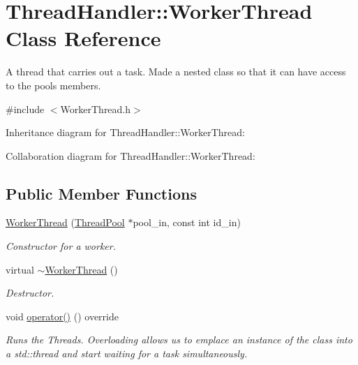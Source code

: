 \hypertarget{classThreadHandler_1_1WorkerThread}{}\section{Thread\+Handler\+::Worker\+Thread Class Reference}
\label{classThreadHandler_1_1WorkerThread}


A thread that carries out a task. Made a nested class so that it can have access to the pools members.  




{\ttfamily \#include $<$Worker\+Thread.\+h$>$}



Inheritance diagram for Thread\+Handler\+::Worker\+Thread\+:


Collaboration diagram for Thread\+Handler\+::Worker\+Thread\+:
\subsection*{Public Member Functions}
\begin{DoxyCompactItemize}
\item 
\mbox{\hyperlink{classThreadHandler_1_1WorkerThread_aaa5da8c1265e775e4bced4526ea70887}{Worker\+Thread}} (\mbox{\hyperlink{classThreadHandler_1_1ThreadPool}{Thread\+Pool}} $\ast$pool\+\_\+in, const int id\+\_\+in)
\begin{DoxyCompactList}\small\item\em Constructor for a worker. \end{DoxyCompactList}\item 
\mbox{\label{classThreadHandler_1_1WorkerThread_ab7e7c25c6ab34e69ce925c08230f246f}} 
virtual \mbox{\hyperlink{classThreadHandler_1_1WorkerThread_ab7e7c25c6ab34e69ce925c08230f246f}{$\sim$\+Worker\+Thread}} ()
\begin{DoxyCompactList}\small\item\em Destructor. \end{DoxyCompactList}\item 
void \mbox{\hyperlink{classThreadHandler_1_1WorkerThread_aec4053e02c749fea8f382b9e2c7bf91a}{operator()}} () override
\begin{DoxyCompactList}\small\item\em Runs the Threads. Overloading allows us to emplace an instance of the class into a std\+::thread and start waiting for a task simultaneously. \end{DoxyCompactList}\end{DoxyCompactItemize}


